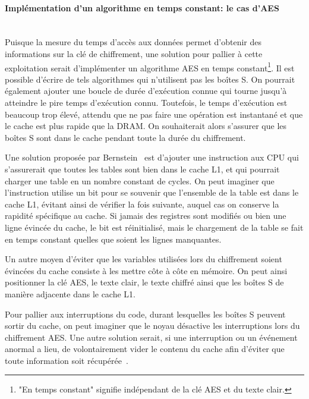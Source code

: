 \documentclass[a4paper,11pt]{article}
\begin{document}
\paragraph{Implémentation d'un algorithme en temps constant: le cas d'AES} ~\\
Puisque la mesure du temps d'accès aux données permet d'obtenir des informations sur la clé de chiffrement, une solution pour pallier à cette exploitation serait d'implémenter un algorithme AES en temps constant\footnote{"En temps constant" signifie indépendant de la clé AES et du texte clair.}. Il est possible d'écrire de tels algorithmes qui n'utilisent pas les boîtes S. On pourrait également ajouter une boucle de durée d'exécution connue qui tourne jusqu'à atteindre le pire temps d'exécution connu. Toutefois, le temps d'exécution est beaucoup trop élevé, attendu que ne pas faire une opération est instantané et que le cache est plus rapide que la DRAM.
On souhaiterait alors s'assurer que les boîtes S sont dans le cache pendant toute la durée du chiffrement.

Une solution proposée par Bernstein~\cite{bernstein2005cache} est d'ajouter une instruction aux CPU qui s'assurerait que toutes les tables sont bien dans le cache L1, et qui pourrait charger une table en un nombre constant de cycles. On peut imaginer que l'instruction utilise un bit pour se souvenir que l'ensemble de la table est dans le cache L1, évitant ainsi de vérifier la fois suivante, auquel cas on conserve la rapidité spécifique au cache. Si jamais des registres sont modifiés ou bien une ligne évincée du cache, le bit est réinitialisé, mais le chargement de la table se fait en temps constant quelles que soient les lignes manquantes.

Un autre moyen d'éviter que les variables utilisées lors du chiffrement soient évincées du cache consiste à les mettre côte à côte en mémoire. On peut ainsi positionner la clé AES, le texte clair, le texte chiffré ainsi que les boîtes S de manière adjacente dans le cache L1.

Pour pallier aux interruptions du code, durant lesquelles les boîtes S peuvent sortir du cache, on peut imaginer que le noyau désactive les interruptions lors du chiffrement AES. Une autre solution serait, si une interruption ou un événement anormal a lieu, de volontairement vider le contenu du cache afin d'éviter que toute information soit récupérée~\cite{canteaut2006understanding}.

\end{document}
